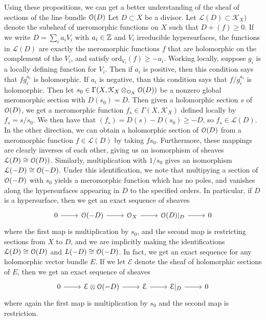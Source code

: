 Using these propositions, we can get a better understanding of the sheaf
of sections of the line bundle $\mathcal{O}(D)$ Let $D \subset X$ be a
divisor. Let $\mathcal{L}(D) \subset \mathcal{K}_X)$ denote the subsheaf of
meromorphic functions on $X$ such that $D + (f) \geq 0$. If we write
$D = \sum_i a_iV_i$ with $a_i \in \mathbb{Z}$ and $V_i$ irreducible hypersurfaces,
the functions in $\mathcal{L}(D)$ are exactly the meromorphic functions $f$
that are holomorphic on the complement of the $V_i$, and satisfy
$\mathrm{ord}_{V_i}(f) \geq -a_i$. Working locally, suppose $g_i$ is a
locally defining function for $V_i$. Then if $a_i$ is positive, then
this condition says that $fg_i^{a_i}$ is holomorphic. If $a_i$ is negative,
than this condition says that $f/g_i^{a_i}$ is holomorphic. Then let
$s_0 \in \Gamma(X,\mathcal{K}_X\otimes_{\mathcal{O}_X} \mathcal{O}(D))$ be a nonzero global meromorphic
section with $D(s_0) = D$. Then given a  holomorphic section $s$ of
$\mathcal{O}(D)$, we get a meromorphic function $f_s \in \Gamma(X,\mathcal{K}_X)$
defined locally by $f_s = s/s_0$. We then have that
$(f_s) = D(s) - D(s_0) \geq - D$, so $f_s \in \mathcal{L}(D)$. In the
other direction, we can obtain a holomorphic section of $\mathcal{O}(D)$ from
a meromorphic function $f \in \mathcal{L}(D)$ by taking $fs_0$. Furthermore,
these mappings are clearly inverses of each other, giving us an isomorphism
of sheaves $\mathcal{L}(D) \cong \mathcal{O}(D))$. Similarly, multiplication with $1/s_0$
gives an isomorphism $\mathcal{L}(-D) \cong \mathcal{O}(-D)$. Under this identification,
we note that multipying a section of $\mathcal{O}(-D)$ with $s_0$ yields a meromorphic
function which has no poles, and vanishes along the hypersurfaces appearing
in $D$ to the specified orders. In particular, if $D$ is a hypersurface,
then we get an exact sequence of sheaves
\[\begin{tikzcd}
0 \ar[r] & \O(-D) \ar[r] & \O_X \ar[r] & \O(D)\vert_D \ar[r] & 0
\end{tikzcd}\]
where the first map is multiplication by $s_0$, and the second map is
restricting sections from $X$ to $D$, and we are implicitly making the
identifications $\mathcal{L}(D) \cong \mathcal{O}(D)$ and $L(-D) \cong \mathcal{O}(-D)$.
In fact, we get an exact sequence for any holomorphic vector bundle
$E$. If we let $\mathcal{E}$ denote the sheaf of holomorphic sections of $E$,
then we get an exact sequence of sheaves
\[\begin{tikzcd}
0 \ar[r] & \mathcal{E} \otimes \O(-D) \ar[r] & \mathcal{E} \ar[r] & \mathcal{E}\vert_D
\ar[r] & 0
\end{tikzcd}\]
where again the first map is multiplication by $s_0$ and the second map is
restriction.
%
%